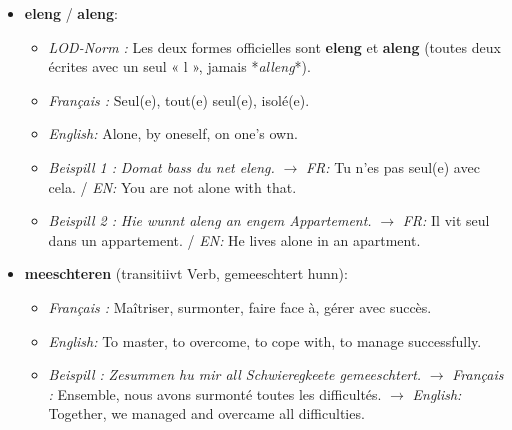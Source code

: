 \begin{itemize}
\begin{itemize}
        \item \textbf{e Fëllen} (n., Pl. \textit{d'Fëllen}):
        \begin{itemize}
            \item \textit{Français :} Le poulain (le petit du cheval). Genre neutre, voyelle brève \textit{ë}.
            \item \textit{English:} The foal / young horse. Neuter noun, short vowel \textit{ë}.
            \item \textit{Beispill:} \textit{D'Mier steet mat hirem klenge Fëllen op der Wiss.} $\rightarrow$ \textit{FR:} La jument se tient avec son petit poulain dans le pré. / \textit{EN:} The mare is standing with her little foal in the meadow.
        \end{itemize}
    \end{itemize}

    \vspace{0.6em}

    \item \textbf{eleng} / \textbf{aleng}:
    \begin{itemize}
        \item \textit{LOD-Norm :} Les deux formes officielles sont \textbf{eleng} et \textbf{aleng} (toutes deux écrites avec un seul « l », jamais *\textit{alleng}*).
        \item \textit{Français :} Seul(e), tout(e) seul(e), isolé(e).
        \item \textit{English:} Alone, by oneself, on one's own.
        \item \textit{Beispill 1 :} \textit{Domat bass du net eleng.} $\rightarrow$ \textit{FR:} Tu n'es pas seul(e) avec cela. / \textit{EN:} You are not alone with that.
        \item \textit{Beispill 2 :} \textit{Hie wunnt aleng an engem Appartement.} $\rightarrow$ \textit{FR:} Il vit seul dans un appartement. / \textit{EN:} He lives alone in an apartment.
    \end{itemize}

    \vspace{0.6em}

    \item \textbf{meeschteren} (transitiivt Verb, gemeeschtert hunn):
    \begin{itemize}
        \item \textit{Français :} Maîtriser, surmonter, faire face à, gérer avec succès.
        \item \textit{English:} To master, to overcome, to cope with, to manage successfully.
        \item \textit{Beispill :} \textit{Zesummen hu mir all Schwieregkeete gemeeschtert.}
        $\rightarrow$ \textit{Français :} Ensemble, nous avons surmonté toutes les difficultés.
        $\rightarrow$ \textit{English:} Together, we managed and overcame all difficulties.
    \end{itemize}


\end{itemize}
